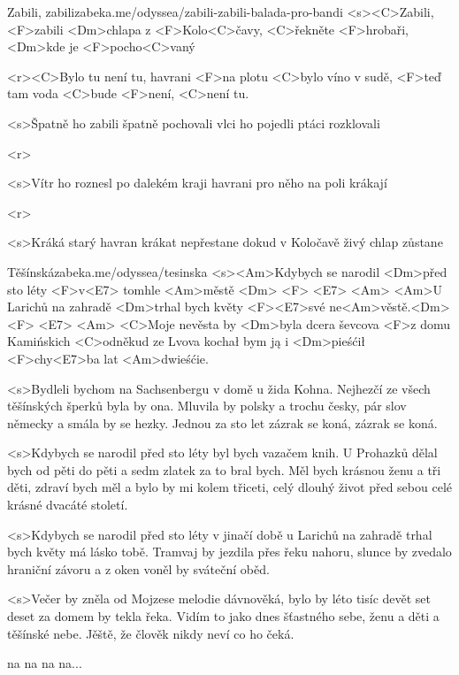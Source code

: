 \begin{song}{3}{Zabili, zabili}{zabeka.me/odyssea/zabili-zabili-balada-pro-bandi}
<s><C>Zabili, <F>zabili <Dm>chlapa z <F>Kolo<C>čavy,
<C>řekněte <F>hrobaři, <Dm>kde je <F>pocho<C>vaný

<r><C>Bylo tu není tu, havrani <F>na plotu
<C>bylo víno v sudě, <F>teď tam voda <C>bude
<F>není, <C>není tu.

<s>Špatně ho zabili
špatně pochovali
vlci ho pojedli
ptáci rozklovali

<r>

<s>Vítr ho roznesl
po dalekém kraji
havrani pro něho
na poli krákají

<r>

<s>Kráká starý havran
krákat nepřestane
dokud v Koločavě
živý chlap zůstane 

\end{song}
\begin{song}{4}{Těšínská}{zabeka.me/odyssea/tesinska}
<s><Am>Kdybych se narodil <Dm>před sto léty
<F>v<E7> tomhle <Am>městě <Dm> <F> <E7> <Am>
<Am>U Larichů na zahradě <Dm>trhal bych květy
<F><E7>své ne<Am>věstě.<Dm> <F> <E7> <Am>
<C>Moje nevěsta by <Dm>byla dcera ševcova
<F>z domu Kamińskich <C>odněkud ze Lvova
kochał bym ją i <Dm>pieśćił <F>chy<E7>ba lat <Am>dwieśćie. 

<s>Bydleli bychom na Sachsenbergu v domě u žida Kohna.
Nejhezčí ze všech těšínských šperků byla by ona.
Mluvila by polsky a trochu česky,
pár slov německy a smála by se hezky.
Jednou za sto let zázrak se koná, zázrak se koná. 

<s>Kdybych se narodil před sto léty byl bych vazačem knih.
U Prohazků dělal bych od pěti do pěti a sedm zlatek za to bral bych.
Měl bych krásnou ženu a tři děti, 
zdraví bych měl a bylo by mi kolem třiceti,
celý dlouhý život před sebou celé krásné dvacáté století. 

<s>Kdybych se narodil před sto léty v jinačí době
u Larichů na zahradě trhal bych květy má lásko tobě.
Tramvaj by jezdila přes řeku nahoru,
slunce by zvedalo hraniční závoru
a z oken voněl by sváteční oběd. 

<s>Večer by zněla od Mojzese melodie dávnověká,
bylo by léto tisíc devět set deset za domem by tekla řeka.
Vidím to jako dnes šťastného sebe,
ženu a děti a těšínské nebe.
Jěště, že člověk nikdy neví co ho čeká. 

na na na na... 

\end{song}
